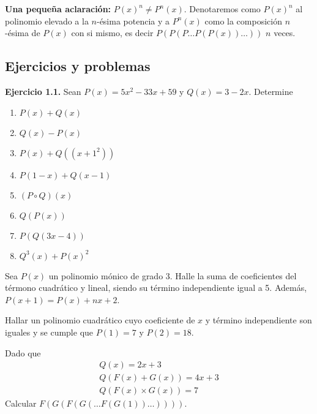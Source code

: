 \textbf{Una pequeña aclaración:} $P(x)^n \neq P^n(x)$. Denotaremos como $P(x)^n$ al polinomio elevado a la $n$-ésima potencia y a $P^n(x)$ como la composición $n$-ésima de $P(x)$ con si mismo, es decir $P(P(P\dots P(P(x))\dots))$ $n$ veces.


\subsection{Ejercicios y problemas}

\textbf{Ejercicio 1.1.} Sean $P(x) = 5x^2 - 33x + 59$ y $Q(x) = 3 - 2x$. Determine
\begin{multicols}{2}
    \begin{enumerate}
        \item $P(x) + Q(x)$
        \item $Q(x) - P(x)$
        \item $P(x) + Q((x+1^2))$
        \item $P(1-x) + Q(x-1)$
        \item $(P\circ Q)(x)$
        \item $Q(P(x))$
        \item $P(Q(3x - 4))$
        \item $Q^3(x) + P(x)^2$
    \end{enumerate}
\end{multicols}

\begin{section-problem}
    Sea $P(x)$ un polinomio mónico de grado 3. Halle la suma de coeficientes del térmono cuadrático y lineal, siendo su término independiente igual a 5. Además, $P(x + 1) = P(x) + nx + 2$.
\end{section-problem}

\begin{section-problem}
    Hallar un polinomio cuadrático cuyo coeficiente de $x$ y término independiente son iguales y se cumple que $P(1) = 7$ y $P(2) = 18$.
\end{section-problem}

\begin{section-problem}
    Dado que
        \begin{gather*}
            Q(x) = 2x + 3 \\
            Q( F(x) + G(x) ) = 4x + 3 \\
            Q( F(x) \times G(x) ) = 7
        \end{gather*}
    Calcular $F(G(F(G(\dots F(G(1))\dots))))$.
\end{section-problem}